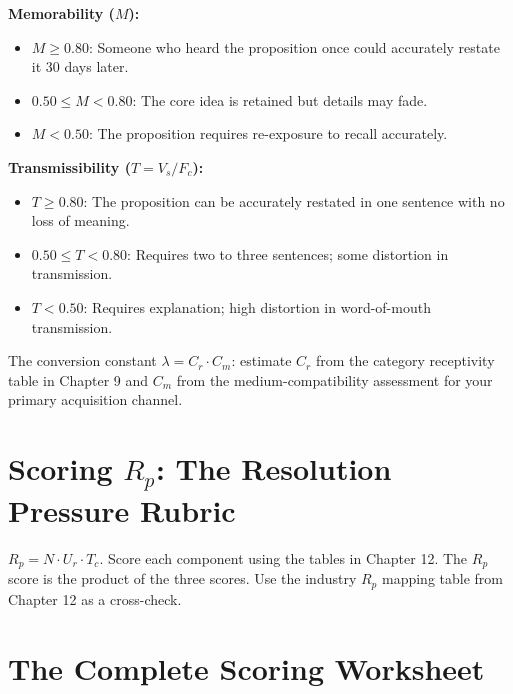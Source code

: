 \documentclass[12pt, openany]{book}
\theoremstyle{thmstyle}
\theoremstyle{defstyle}
\begin{document}
\textbf{Memorability ($M$):}
\begin{itemize}[leftmargin=1.5em]
  \item $M \geq 0.80$: Someone who heard the proposition once could accurately restate it 30 days later.
  \item $0.50 \leq M < 0.80$: The core idea is retained but details may fade.
  \item $M < 0.50$: The proposition requires re-exposure to recall accurately.
\end{itemize}

\textbf{Transmissibility ($T = V_s / F_c$):}
\begin{itemize}[leftmargin=1.5em]
  \item $T \geq 0.80$: The proposition can be accurately restated in one sentence with no loss of meaning.
  \item $0.50 \leq T < 0.80$: Requires two to three sentences; some distortion in transmission.
  \item $T < 0.50$: Requires explanation; high distortion in word-of-mouth transmission.
\end{itemize}

The conversion constant $\lambda = C_r \cdot C_m$: estimate $C_r$ from the category receptivity table in Chapter 9 and $C_m$ from the medium-compatibility assessment for your primary acquisition channel.

\section{Scoring $R_p$: The Resolution Pressure Rubric}

$R_p = N \cdot U_r \cdot T_c$. Score each component using the tables in Chapter 12. The $R_p$ score is the product of the three scores. Use the industry $R_p$ mapping table from Chapter 12 as a cross-check.

\section{The Complete Scoring Worksheet}
\end{document}
